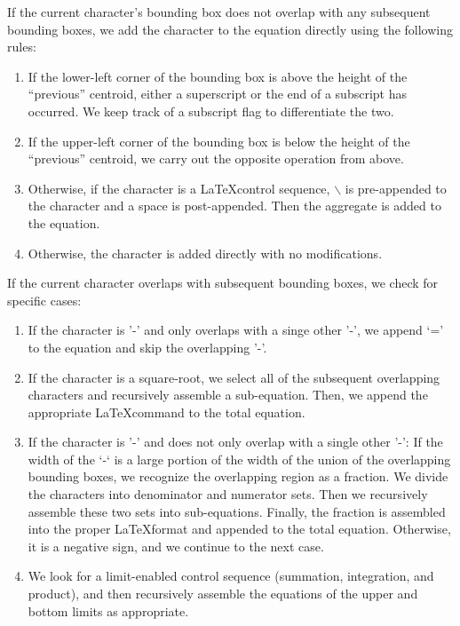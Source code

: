 \documentclass[journal]{IEEEtran}
\begin{document}
If the current character’s bounding box does not overlap with any subsequent bounding boxes, we add the character to the equation directly using the following rules:
\begin{enumerate}
    \item If the lower-left corner of the bounding box is above the height of the “previous” centroid, either a superscript or the end of a subscript has occurred. We keep track of a subscript flag to differentiate the two.
    \item If the upper-left corner of the bounding box is below the height of the “previous” centroid, we carry out the opposite operation from above.
    \item Otherwise, if the character is a \LaTeX control sequence, $\backslash$ is pre-appended to the character and a space is post-appended. Then the aggregate is added to the equation.
    \item Otherwise, the character is added directly with no modifications.
    
\end{enumerate}

If the current character overlaps with subsequent bounding boxes, we check for specific cases:
\begin{enumerate}    
    \item If the character is '-' and only overlaps with a singe other '-', we append ‘=’ to the equation and skip the overlapping '-'.
    \item If the character is a square-root, we select all of the subsequent overlapping characters and recursively assemble a sub-equation. Then, we append the appropriate \LaTeX command to the total equation.
    \item If the character is '-' and does not only overlap with a single other '-':
    \subitem If the width of the ‘-‘ is a large portion of the width of the union of the overlapping bounding boxes, we recognize the overlapping region as a fraction. We divide the characters into  denominator and numerator sets. Then we recursively assemble these two sets into sub-equations. Finally, the fraction is assembled into the proper \LaTeX format and appended to the total equation.
    \subitem Otherwise, it is a negative sign, and we continue to the next case.
    \item We look for a limit-enabled control sequence (summation, integration, and product), and then recursively assemble the equations of the upper and bottom limits as appropriate.
\end{enumerate}
\end{document}
